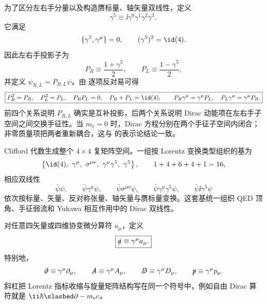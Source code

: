 为了区分左右手分量以及构造赝标量、轴矢量双线性，定义
\begin{equation}
 \boxed{\gamma^5\equiv \ii\gamma^0\gamma^1\gamma^2\gamma^3,}
 \label{eq:gamma5-def}
\end{equation}
它满足
\begin{equation}
 \{\gamma^5,\gamma^\mu\}=0,
 \qquad
 (\gamma^5)^2=\id(4).
 \label{eq:gamma5-anticomm}
\end{equation}
因此左右手投影子为
\begin{equation}
 \boxed{
 P_R\equiv\frac{1+\gamma^5}{2},
 \qquad
 P_L\equiv\frac{1-\gamma^5}{2},}
 \label{eq:chiral-projectors}
\end{equation}
并定义 $\psi_{R,L}=P_{R,L}\psi$。由 逐项反对易可得
\begin{equation}
 \boxed{
 P_R^2=P_R,\quad P_L^2=P_L,\quad P_RP_L=0,\quad P_R+P_L=\id(4),
 \qquad
 P_R\gamma^\mu=\gamma^\mu P_L,\quad
 P_L\gamma^\mu=\gamma^\mu P_R.}
 \label{eq:chiral-projector-algebra-dp68}
\end{equation}
前四个关系说明 $P_{R,L}$ 确实是互补投影，后两个关系说明 Dirac 动能项在左右手子空间之间交换手征性。当 $m_{\mathrm e}=0$ 时，Dirac 方程分别在两个手征子空间内闭合；非零质量项把两者重新耦合，这与
 的表示论结论一致。

Clifford 代数生成整个 $4\times4$ 复矩阵空间。一组按 Lorentz 变换类型组织的基为
\begin{equation}
 \left\{
 \id(4),\ \gamma^\mu,\ \sigma^{\mu\nu},\
 \gamma^\mu\gamma^5,\ \gamma^5
 \right\},
 \qquad 1+4+6+4+1=16,
 \label{eq:dirac-bilinear-basis}
\end{equation}
相应双线性
\begin{equation}
 \bar\psi\psi,\qquad
 \bar\psi\gamma^\mu\psi,\qquad
 \bar\psi\sigma^{\mu\nu}\psi,\qquad
 \bar\psi\gamma^\mu\gamma^5\psi,\qquad
 \bar\psi\ii\gamma^5\psi
 \label{eq:dirac-bilinears}
\end{equation}
依次按标量、矢量、反对称张量、轴矢量与赝标量变换。这套基统一组织 QED 顶角、手征弱流和 Yukawa 相互作用中的 Dirac 双线性。

对任意四矢量或四维协变微分算符 $a_\mu$，定义
\begin{equation*}
 \boxed{\slashed a\equiv\gamma^\mu a_\mu.}
\end{equation*}
特别地，
\begin{equation*}
 \slashed\partial\equiv\gamma^\mu\partial_\mu,
 \qquad
 \slashed A\equiv\gamma^\mu A_\mu,
 \qquad
 \slashed D\equiv\gamma^\mu D_\mu,
 \qquad
 \slashed p\equiv\gamma^\mu p_\mu.
\end{equation*}
斜杠把 Lorentz 指标收缩与旋量矩阵结构写在同一个符号中，例如自由 Dirac 算符就是 $\ii\hbar\slashed\partial-m_{\mathrm e} c$。

